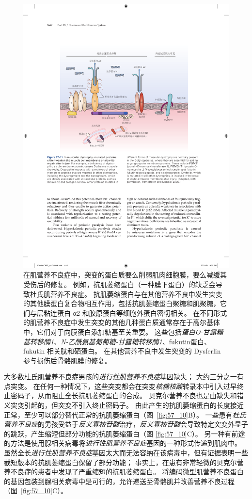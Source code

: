 \begin{figure}[htbp]
	\centering
	\includegraphics[width=0.95\linewidth]{chap57/fig_57_11}
	\caption{在肌营养不良症中，突变的蛋白质要么削弱肌肉细胞膜，要么减缓其受伤后的修复。
		例如，抗肌萎缩蛋白（一种膜下蛋白）的缺乏会导致杜氏肌营养不良症。
		抗肌萎缩蛋白与在其他营养不良中发生突变的其他膜蛋白复合物相互作用，包括抗肌萎缩蛋白聚糖和肌聚糖，它们与层粘连蛋白 α2 和胶原蛋白等细胞外蛋白密切相关。
		在不同形式的肌营养不良症中发生突变的其他几种蛋白质通常存在于高尔基体中，它们对于向膜蛋白添加糖基至关重要。
		这些包括\textit{蛋白O-甘露糖基转移酶1}、\textit{N-乙酰氨基葡萄糖-甘露糖转移酶1}、fukutin蛋白、fukutin 相关肽和硒蛋白。
		在其他营养不良中发生突变的 Dysferlin 参与损伤后骨骼肌膜的修复\cite{brown2005harrison}。}
	\label{fig:57_11}
\end{figure}


大多数杜氏肌营养不良症男孩的\textit{进行性肌营养不良症}基因缺失；
大约三分之一有点突变。
在任何一种情况下，这些突变都会在突变\textit{核糖核酸}转录本中引入过早终止密码子，从而阻止全长抗肌萎缩蛋白的合成。
贝克尔营养不良也是由缺失和错义突变引起的，但突变不引入终止密码子。
由此产生的抗肌萎缩蛋白的长度接近正常，至少可以部分替代正常的抗肌萎缩蛋白（图~\ref{fig:57_10}B）。
一些患有\textit{杜氏营养不良症}的男孩受益于\textit{反义寡核苷酸}治疗，\textit{反义寡核苷酸}会导致特定突变外显子的跳跃，产生缩短但部分功能的抗肌萎缩蛋白（图 \ref{fig:57_10}C）。
另一种有前途的方法是使用腺相关病毒将\textit{进行性肌营养不良症}基因的一种形式传递到肌肉中。
虽然全长\textit{进行性肌营养不良症}基因太大而无法容纳在该病毒中，但有证据表明一些截短版本的抗肌萎缩蛋白保留了部分功能；
事实上，在患有非常轻微的贝克尔营养不良症的患者中发现了严重缩短的抗肌萎缩蛋白。
将编码微型肌营养不良蛋白的基因包装到腺相关病毒中是可行的，允许递送至骨骼肌并改善营养不良过程（图~\ref{fig:57_10}C）。


